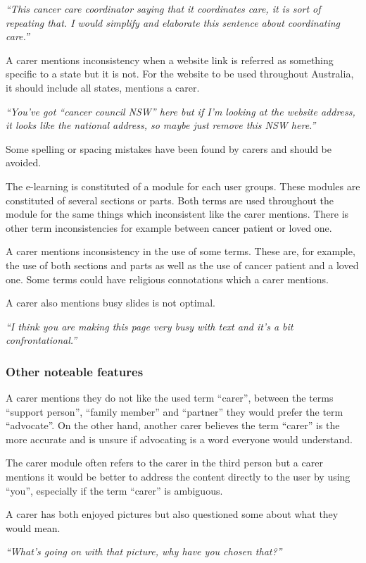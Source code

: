 \documentclass{sigchi}
\begin{document}
\textit{“This cancer care coordinator saying that it coordinates care, it is sort of repeating that. I would simplify and elaborate this sentence about coordinating care.”}

A carer mentions inconsistency when a website link is referred as something specific to a state but it is not. For the website to be used throughout Australia, it should include all states, mentions a carer. 

\textit{“You’ve got “cancer council NSW” here but if I’m looking at the website address, it looks like the national address, so maybe just remove this NSW here.”}

Some spelling or spacing mistakes have been found by carers and should be avoided.

The e-learning is constituted of a module for each user groups. These modules are constituted of several sections or parts. Both terms are used throughout the module for the same things which inconsistent like the carer mentions. There is other term inconsistencies for example between cancer patient or loved one.

A carer mentions inconsistency in the use of some terms. These are, for example, the use of both sections and parts as well as the use of cancer patient and a loved one. Some terms could have religious connotations which a carer mentions.

A carer also mentions busy slides is not optimal.

\textit{“I think you are making this page very busy with text and it’s a bit confrontational.”}

\subsubsection{Other noteable features}
A carer mentions they do not like the used term “carer”, between the terms “support person”, “family member” and “partner” they would prefer the term “advocate”. On the other hand, another carer believes the term “carer” is the more accurate and is unsure if advocating is a word everyone would understand.

The carer module often refers to the carer in the third person but a carer mentions it would be better to address the content directly to the user by using “you”, especially if the term “carer” is ambiguous. 

A carer has both enjoyed pictures but also questioned some about what they would mean.

\textit{“What’s going on with that picture, why have you chosen that?”}
\end{document}
